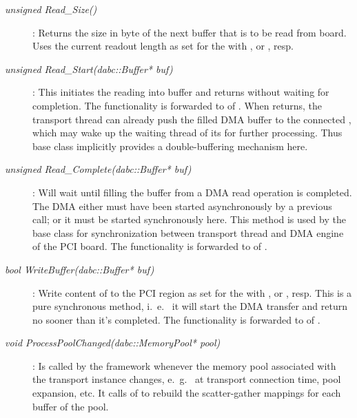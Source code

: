  \begin{description} 


\item[\em unsigned Read\_Size()] :
Returns the size in byte of the next buffer that is to be read from board. 
Uses the current readout length as set for the 
with , or , resp.

\item[\em unsigned Read\_Start(dabc::Buffer* buf)] :
This initiates the reading into buffer  and returns
without waiting for completion. The functionality is
forwarded to  of . 
When  returns, the transport thread
can already push the  filled DMA buffer 
to the connected , 
which may wake up the waiting thread of its  for further
processing. Thus base class  
implicitly provides a double-buffering mechanism here.

\item[\em unsigned Read\_Complete(dabc::Buffer* buf)] :
Will wait until filling the buffer  from a DMA read operation
is completed. The DMA either must have been started asynchronously 
by a previous  call; or it must be started 
synchronously here.
This method is used by the base class for synchronization
between transport thread and DMA engine of the PCI board. 
The functionality is forwarded to  
of . 


\item[\em bool WriteBuffer(dabc::Buffer* buf)] :
Write content of  to the PCI region 
as set for the 
with , or , resp.
This is a pure synchronous method, i.~e.~ it will start the DMA
transfer and return no sooner than it's completed.
The functionality is forwarded to  
of . 

\item[\em void ProcessPoolChanged(dabc::MemoryPool* pool)] :
Is called by the framework whenever the memory pool associated with the 
transport instance changes, e.~g.~ at transport connection time, 
pool expansion, etc. It calls  
of 
to rebuild the scatter-gather mappings for each buffer of the pool.


\end{description} 

